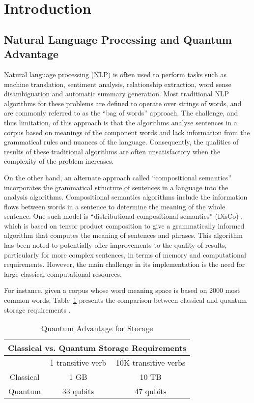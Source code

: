 \section{Introduction}
\label{sec:introduction}
\subsection{Natural Language Processing and Quantum Advantage}
Natural language processing (NLP) is often used to perform tasks such as machine translation, sentiment analysis, relationship extraction, word sense disambiguation and automatic summary generation. Most traditional NLP algorithms for these problems are defined to operate over strings of words, and are commonly referred to as the “bag of words” approach. The challenge, and thus limitation, of this approach is that the algorithms analyse sentences in a corpus based on meanings of the component words and lack information from the grammatical rules and nuances of the language. Consequently, the qualities of results of these traditional algorithms are often unsatisfactory when the complexity of the problem increases.

On the other hand, an alternate approach called ``compositional semantics” incorporates the grammatical structure of sentences in a language into the analysis algorithms. Compositional semantics algorithms include the information flows between words in a sentence to determine the meaning of the whole sentence. One such model is “distributional compositional semantics” (DisCo) \cite{Zeng_Coecke_2016}, which is based on tensor product composition to give a grammatically informed algorithm that computes the meaning of sentences and phrases. This algorithm has been noted to potentially offer improvements to the quality of results, particularly for more complex sentences, in terms of memory and computational requirements. However, the main challenge in its implementation is the need for large classical computational resources.

For instance, given a corpus whose word meaning space is based on 2000 most common words, Table~\ref{tab:quantum_advantage_for_storage} presents the comparison between classical and quantum storage requirements \cite{Zeng_Coecke_2016}.

\begin{table}[!ht]
  \centering
  \begin{tabular}{|c|c|c|}
    \hline
    \multicolumn{3}{|c|}{Classical vs. Quantum Storage Requirements} \\
    \hline \hline
              & 1 transitive verb & 10K transitive verbs \\
    \hline
    Classical & 1 GB              & 10 TB \\
    Quantum   & 33 qubits         & 47 qubits \\
    \hline
  \end{tabular}
  \caption{Quantum Advantage for Storage}
  \label{tab:quantum_advantage_for_storage}
\end{table}

